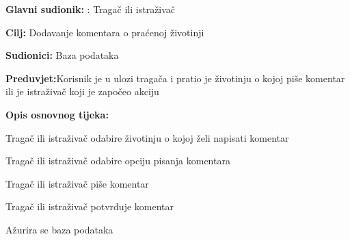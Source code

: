 					\noindent {}
					\begin{packed_item}
	
						\item \textbf{Glavni sudionik: }: Tragač ili istraživač 
						\item  \textbf{Cilj:} Dodavanje komentara o praćenoj životinji
						\item  \textbf{Sudionici:} Baza podataka
						\item  \textbf{Preduvjet:}Korisnik je u ulozi tragača i pratio je životinju o kojoj piše komentar ili je istraživač koji je započeo akciju
						\item  \textbf{Opis osnovnog tijeka:}
						
						\item[] \begin{packed_enum}
	
							\item Tragač ili istraživač odabire životinju o kojoj želi napisati komentar
							\item Tragač ili istraživač odabire opciju pisanja komentara
							\item   Tragač ili istraživač piše komentar
							\item  Tragač ili istraživač potvrđuje komentar
							\item  Ažurira se baza podataka
							
						\end{packed_enum}
					\end{packed_item}
					\noindent {}

